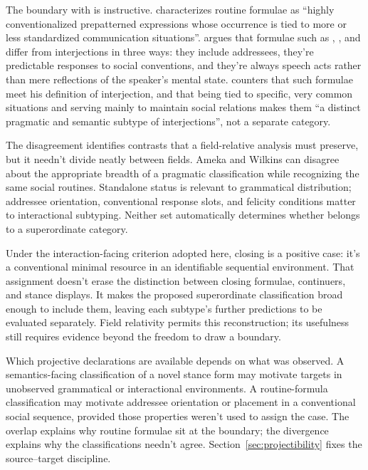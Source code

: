 \documentclass[12pt]{article}
\begin{document}
The boundary with  is instructive. \textcite[2--3]{coulmas1981} characterizes routine formulae as \enquote{highly conventionalized prepatterned expressions whose occurrence is tied to more or less standardized communication situations}. \textcite[108--110]{ameka1992} argues that formulae such as , , and  differ from interjections in three ways: they include addressees, they're predictable responses to social conventions, and they're always speech acts rather than mere reflections of the speaker's mental state. \textcite[142]{wilkins1992} counters that such formulae meet his definition of interjection, and that being tied to specific, very common situations and serving mainly to maintain social relations makes them \enquote{a distinct pragmatic and semantic subtype of interjections}, not a separate category.

The disagreement identifies contrasts that a field-relative analysis must preserve, but it needn't divide neatly between fields. Ameka and Wilkins can disagree about the appropriate breadth of a pragmatic classification while recognizing the same social routines. Standalone status is relevant to grammatical distribution; addressee orientation, conventional response slots, and felicity conditions matter to interactional subtyping. Neither set automatically determines whether  belongs to a superordinate category.

Under the interaction-facing criterion adopted here, closing  is a positive case: it's a conventional minimal resource in an identifiable sequential environment. That assignment doesn't erase the distinction between closing formulae, continuers, and stance displays. It makes the proposed superordinate classification broad enough to include them, leaving each subtype's further predictions to be evaluated separately. Field relativity permits this reconstruction; its usefulness still requires evidence beyond the freedom to draw a boundary.

Which projective declarations are available depends on what was observed. A semantics-facing classification of a novel stance form may motivate targets in unobserved grammatical or interactional environments. A routine-formula classification may motivate addressee orientation or placement in a conventional social sequence, provided those properties weren't used to assign the case. The overlap explains why routine formulae sit at the boundary; the divergence explains why the classifications needn't agree. Section~\ref{sec:projectibility} fixes the source--target discipline.
\end{document}
